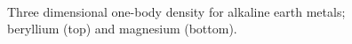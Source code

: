 \begin{frame}
\begin{figure}
\begin{center}
     \\
  \caption{Three dimensional one-body density for alkaline earth metals; beryllium (top) and magnesium (bottom).}
  \label{fig:OBD_alkaline_Atoms_2D_combo}
 \end{center}
\end{figure}
\end{frame}

